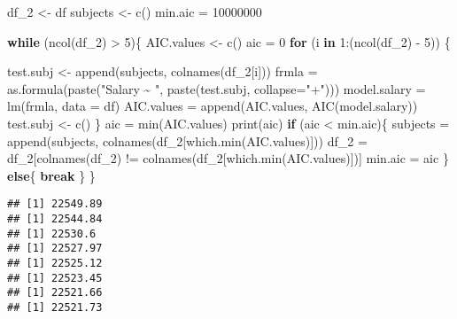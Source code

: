 \documentclass[
]{article}
\newenvironment{Shaded}{\begin{snugshade}}{\end{snugshade}}
\newcommand{\AttributeTok}[1]{\textcolor[rgb]{0.77,0.63,0.00}{#1}}
\newcommand{\ControlFlowTok}[1]{\textcolor[rgb]{0.13,0.29,0.53}{\textbf{#1}}}
\newcommand{\DecValTok}[1]{\textcolor[rgb]{0.00,0.00,0.81}{#1}}
\newcommand{\FunctionTok}[1]{\textcolor[rgb]{0.00,0.00,0.00}{#1}}
\newcommand{\NormalTok}[1]{#1}
\newcommand{\OtherTok}[1]{\textcolor[rgb]{0.56,0.35,0.01}{#1}}
\newcommand{\SpecialCharTok}[1]{\textcolor[rgb]{0.00,0.00,0.00}{#1}}
\newcommand{\StringTok}[1]{\textcolor[rgb]{0.31,0.60,0.02}{#1}}
\begin{document}
\begin{Shaded}
\begin{Highlighting}[]
\NormalTok{df\_2 }\OtherTok{\textless{}{-}}\NormalTok{ df}
\NormalTok{subjects }\OtherTok{\textless{}{-}} \FunctionTok{c}\NormalTok{()}
\NormalTok{min.aic }\OtherTok{=} \DecValTok{10000000}

\ControlFlowTok{while}\NormalTok{ (}\FunctionTok{ncol}\NormalTok{(df\_2) }\SpecialCharTok{\textgreater{}} \DecValTok{5}\NormalTok{)\{}
\NormalTok{  AIC.values }\OtherTok{\textless{}{-}} \FunctionTok{c}\NormalTok{()}
\NormalTok{  aic }\OtherTok{=} \DecValTok{0}
  \ControlFlowTok{for}\NormalTok{ (i }\ControlFlowTok{in} \DecValTok{1}\SpecialCharTok{:}\NormalTok{(}\FunctionTok{ncol}\NormalTok{(df\_2) }\SpecialCharTok{{-}} \DecValTok{5}\NormalTok{)) \{}
  
\NormalTok{    test.subj }\OtherTok{\textless{}{-}} \FunctionTok{append}\NormalTok{(subjects, }\FunctionTok{colnames}\NormalTok{(df\_2[i]))}
\NormalTok{    frmla }\OtherTok{=} \FunctionTok{as.formula}\NormalTok{(}\FunctionTok{paste}\NormalTok{(}\StringTok{"Salary \textasciitilde{} "}\NormalTok{, }\FunctionTok{paste}\NormalTok{(test.subj, }\AttributeTok{collapse=}\StringTok{"+"}\NormalTok{))) }
\NormalTok{    model.salary }\OtherTok{=} \FunctionTok{lm}\NormalTok{(frmla, }\AttributeTok{data =}\NormalTok{ df)}
\NormalTok{    AIC.values }\OtherTok{=} \FunctionTok{append}\NormalTok{(AIC.values, }\FunctionTok{AIC}\NormalTok{(model.salary))}
\NormalTok{    test.subj }\OtherTok{\textless{}{-}} \FunctionTok{c}\NormalTok{()}
\NormalTok{  \}}
\NormalTok{  aic }\OtherTok{=} \FunctionTok{min}\NormalTok{(AIC.values)}
  \FunctionTok{print}\NormalTok{(aic)}
  \ControlFlowTok{if}\NormalTok{ (aic }\SpecialCharTok{\textless{}}\NormalTok{ min.aic)\{}
\NormalTok{    subjects }\OtherTok{=} \FunctionTok{append}\NormalTok{(subjects, }\FunctionTok{colnames}\NormalTok{(df\_2[}\FunctionTok{which.min}\NormalTok{(AIC.values)]))}
\NormalTok{    df\_2 }\OtherTok{=}\NormalTok{ df\_2[}\FunctionTok{colnames}\NormalTok{(df\_2) }\SpecialCharTok{!=} \FunctionTok{colnames}\NormalTok{(df\_2[}\FunctionTok{which.min}\NormalTok{(AIC.values)])]}
\NormalTok{    min.aic }\OtherTok{=}\NormalTok{ aic}
\NormalTok{  \}}
  \ControlFlowTok{else}\NormalTok{\{}
    \ControlFlowTok{break}
\NormalTok{  \}}
\NormalTok{\}}
\end{Highlighting}
\end{Shaded}

\begin{verbatim}
## [1] 22549.89
## [1] 22544.84
## [1] 22530.6
## [1] 22527.97
## [1] 22525.12
## [1] 22523.45
## [1] 22521.66
## [1] 22521.73
\end{verbatim}
\end{document}
